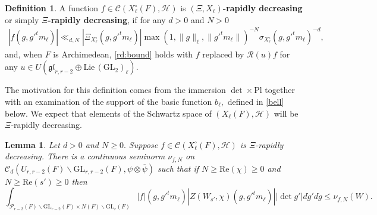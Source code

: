 \documentclass[12pt]{amsart}
\newtheorem{lem}[thm]{Lemma}
\theoremstyle{remark}
\numberwithin{equation}{section}
\newcommand{\GL}{\mathrm{GL}}
\theoremstyle{definition}
\newtheorem{defn}[thm]{Definition}
\numberwithin{equation}{subsection}
\newcommand{\norm}[1]{\lVert#1\rVert}
\begin{document}
\begin{defn} \label{defn:Xi:rapid:loc}
    A function $f \in \mathcal{C}(X^{\circ}_\ell(F),\mathcal{H})$ is \textbf{$(\Xi,X_\ell)$-rapidly decreasing} or simply \textbf{$\Xi$-rapidly decreasing}, if for any $d>0$ and $N>0$ 
    \begin{align} \label{rd:bound}
        |f(g,g'^tm_\ell)|\ll_{d,N} |\Xi_{X_\ell^\circ}(g,g'^tm_\ell)|\max(1,\norm{g}_\ell, \norm{g'^tm_\ell})^{-N}\sigma_{X_\ell^\circ}(g,g'^tm_\ell)^{-d},
    \end{align}   
    and, when $F$ is Archimedean, \eqref{rd:bound} holds with $f$ replaced by $\mathcal{R}(u)f$ for any $u \in U(\mathfrak{gl}_{r,r-2} \oplus \mathrm{Lie}\,(\GL_2)_{\ell}).$
\end{defn}

The motivation for this definition comes from  the immersion $\det \times \mathrm{Pl}$ together with an examination of the support of the basic function $b_\ell,$ defined in \eqref{bell} below. We expect that elements of the Schwartz space of $(X_\ell(F),\mathcal{H})$ will be $\Xi$-rapidly decreasing.



\begin{lem} \label{lem:ZfW} 
Let $d>0$ and $N \ge 0.$ Suppose $f \in \mathcal{C}(X_\ell^\circ(F),\mathcal{H})$ is $\Xi$-rapidly decreasing. There is a continuous seminorm $\nu_{f,N}$ on $\mathcal{C}_{d}(U_{r,r-2}(F) \backslash \GL_{r,r-2}(F),\psi \otimes \overline{\psi})$ such that if
$N\ge \mathrm{Re}(\chi)\ge    0 $ and $N  \geq \mathrm{Re}(s') \ge 0
$
then
$$
\int_{\mathcal{P}_{r-2}(F) \backslash \GL_{r-2}(F) \times N(F) \backslash \GL_r(F)} |f|(g,g'^tm_\ell)|Z(W_{s'},\chi)(g,g'^tm_{\ell})||\det g'| d\dot{g}'d\dot{g} \leq \nu_{f,N}(W).
$$
\end{lem}
\end{document}
